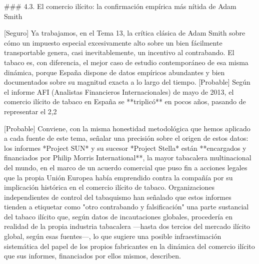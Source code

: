 \documentclass[10pt,a4paper]{article}
\begin{document}
### 4.3. El comercio ilícito: la confirmación empírica más nítida de Adam Smith

[Seguro] Ya trabajamos, en el Tema 13, la crítica clásica de Adam Smith sobre cómo un impuesto especial excesivamente alto sobre un bien fácilmente transportable genera, casi inevitablemente, un incentivo al contrabando. El tabaco es, con diferencia, el mejor caso de estudio contemporáneo de esa misma dinámica, porque España dispone de datos empíricos abundantes y bien documentados sobre su magnitud exacta a lo largo del tiempo. [Probable] Según el informe AFI (Analistas Financieros Internacionales) de mayo de 2013, el comercio ilícito de tabaco en España se **triplicó** en pocos años, pasando de representar el 2,2%

[Probable] Conviene, con la misma honestidad metodológica que hemos aplicado a cada fuente de este tema, señalar una precisión sobre el origen de estos datos: los informes *Project SUN* y su sucesor *Project Stella* están **encargados y financiados por Philip Morris International**, la mayor tabacalera multinacional del mundo, en el marco de un acuerdo comercial que puso fin a acciones legales que la propia Unión Europea había emprendido contra la compañía por su implicación histórica en el comercio ilícito de tabaco. Organizaciones independientes de control del tabaquismo han señalado que estos informes tienden a etiquetar como "otro contrabando y falsificación" una parte sustancial del tabaco ilícito que, según datos de incautaciones globales, procedería en realidad de la propia industria tabacalera —hasta dos tercios del mercado ilícito global, según esas fuentes—, lo que sugiere una posible infraestimación sistemática del papel de los propios fabricantes en la dinámica del comercio ilícito que sus informes, financiados por ellos mismos, describen.
\end{document}
